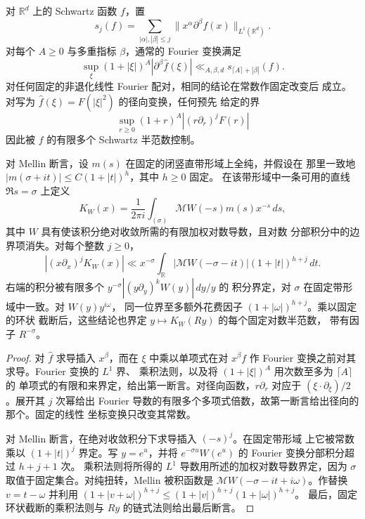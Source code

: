\begin{lemma}
\label{lem:kernel-seminorms}
对 $\mathbb R^d$ 上的 Schwartz 函数 $f$，置
\[
 s_j(f)=\sum_{|\alpha|,|\beta|\le j}
             \|x^\alpha\partial^\beta f(x)\|_{L^1(\mathbb R^d)}.
\]
对每个 $A\ge0$ 与多重指标 $\beta$，通常的 Fourier 变换满足
\[
 \sup_\xi(1+|\xi|)^A|\partial^\beta\widehat f(\xi)|
 \ll_{A,\beta,d}s_{\lceil A\rceil+|\beta|}(f).
\]
对任何固定的非退化线性 Fourier 配对，相同的结论在常数作固定改变后
成立。对写为 $\widehat f(\xi)=F(|\xi|^2)$ 的径向变换，任何预先
给定的界
\[
 \sup_{r\ge0}(1+r)^A|(r\partial_r)^jF(r)|
\]
因此被 $f$ 的有限多个 Schwartz 半范数控制。

对 Mellin 断言，设 $m(s)$ 在固定的闭竖直带形域上全纯，并假设在
那里一致地 $|m(\sigma+it)|\le C(1+|t|)^h$，其中 $h\ge0$ 固定。
在该带形域中一条可用的直线 $\Re s=\sigma$ 上定义
\[
 K_W(x)=\frac1{2\pi i}\int_{(\sigma)}\mathcal MW(-s)m(s)x^{-s}\,ds,
\]
其中 $W$ 具有使该积分绝对收敛所需的有限加权对数导数，且对数
分部积分中的边界项消失。对每个整数 $j\ge0$，
\[
 |(x\partial_x)^jK_W(x)|
 \ll x^{-\sigma}\int_{\mathbb R}
       |\mathcal MW(-\sigma-it)|(1+|t|)^{h+j}\,dt.
\]
右端的积分被有限多个 $y^{-\sigma}|(y\partial_y)^kW(y)|\,dy/y$ 的
积分界定，对 $\sigma$ 在固定带形域中一致。对 $W(y)y^{i\omega}$，
同一位界至多额外花费因子 $(1+|\omega|)^{h+j}$。乘以固定的环状
截断后，这些结论也界定 $y\mapsto K_W(Ry)$ 的每个固定对数半范数，
带有因子 $R^{-\sigma}$。
\end{lemma}

\begin{proof}
对 $\widehat f$ 求导插入 $x^\beta$，而在 $\xi$ 中乘以单项式在对
$x^\beta f$ 作 Fourier 变换之前对其求导。Fourier 变换的 $L^1$ 界、
乘积法则，以及将 $(1+|\xi|)^A$ 用次数至多为 $\lceil A\rceil$ 的
单项式的有限和来界定，给出第一断言。对径向函数，$r\partial_r$
对应于 $(\xi\cdot\partial_\xi)/2$。展开其 $j$ 次幂给出 Fourier
导数的有限多个多项式倍数，故第一断言给出径向的那个。固定的线性
坐标变换只改变其常数。

对 Mellin 断言，在绝对收敛积分下求导插入 $(-s)^j$。在固定带形域
上它被常数乘以 $(1+|t|)^j$ 界定。写 $y=e^u$，并将
$e^{-\sigma u}W(e^u)$ 的 Fourier 变换分部积分超过 $h+j+1$ 次。
乘积法则将所得的 $L^1$ 导数用所述的加权对数导数界定，因为
$\sigma$ 取值于固定集合。对纯扭转，Mellin 被积函数是
$\mathcal MW(-\sigma-it+i\omega)$。作替换 $v=t-\omega$ 并利用
$(1+|v+\omega|)^{h+j}\le(1+|v|)^{h+j}(1+|\omega|)^{h+j}$。
最后，固定环状截断的乘积法则与 $Ry$ 的链式法则给出最后断言。
\end{proof}

